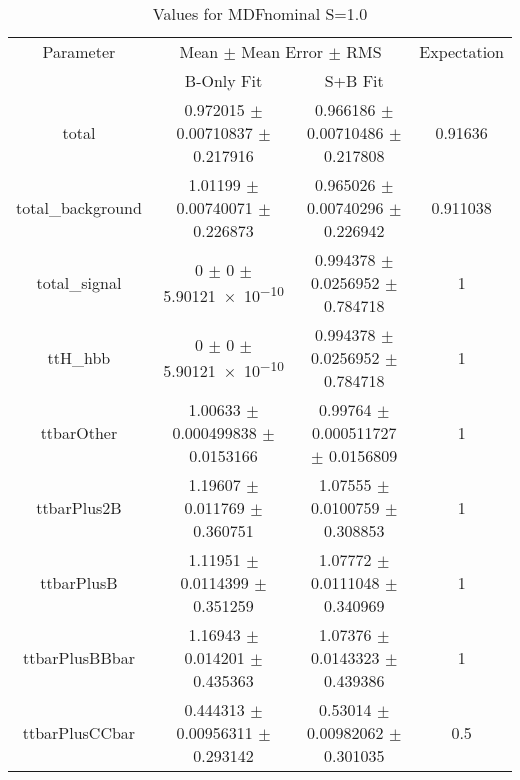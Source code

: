 \begin{table}
\centering
\caption{Values for MDFnominal S=1.0}
\begin{tabular}{cccc}
\toprule
Parameter & \multicolumn{2}{c}{Mean $\pm$ Mean Error $\pm$ RMS} & Expectation\\
 & B-Only Fit & S+B Fit & \\
\midrule
total & \num{0.972015} $\pm$ \num{0.00710837} $\pm$ \num{0.217916} & \num{0.966186} $\pm$ \num{0.00710486} $\pm$ \num{0.217808} & \num{0.91636}\\
total\_background & \num{1.01199} $\pm$ \num{0.00740071} $\pm$ \num{0.226873} & \num{0.965026} $\pm$ \num{0.00740296} $\pm$ \num{0.226942} & \num{0.911038}\\
total\_signal & \num{0} $\pm$ \num{0} $\pm$ \num{5.90121e-10} & \num{0.994378} $\pm$ \num{0.0256952} $\pm$ \num{0.784718} & \num{1}\\
ttH\_hbb & \num{0} $\pm$ \num{0} $\pm$ \num{5.90121e-10} & \num{0.994378} $\pm$ \num{0.0256952} $\pm$ \num{0.784718} & \num{1}\\
ttbarOther & \num{1.00633} $\pm$ \num{0.000499838} $\pm$ \num{0.0153166} & \num{0.99764} $\pm$ \num{0.000511727} $\pm$ \num{0.0156809} & \num{1}\\
ttbarPlus2B & \num{1.19607} $\pm$ \num{0.011769} $\pm$ \num{0.360751} & \num{1.07555} $\pm$ \num{0.0100759} $\pm$ \num{0.308853} & \num{1}\\
ttbarPlusB & \num{1.11951} $\pm$ \num{0.0114399} $\pm$ \num{0.351259} & \num{1.07772} $\pm$ \num{0.0111048} $\pm$ \num{0.340969} & \num{1}\\
ttbarPlusBBbar & \num{1.16943} $\pm$ \num{0.014201} $\pm$ \num{0.435363} & \num{1.07376} $\pm$ \num{0.0143323} $\pm$ \num{0.439386} & \num{1}\\
ttbarPlusCCbar & \num{0.444313} $\pm$ \num{0.00956311} $\pm$ \num{0.293142} & \num{0.53014} $\pm$ \num{0.00982062} $\pm$ \num{0.301035} & \num{0.5}\\
\bottomrule
\end{tabular}
\end{table}